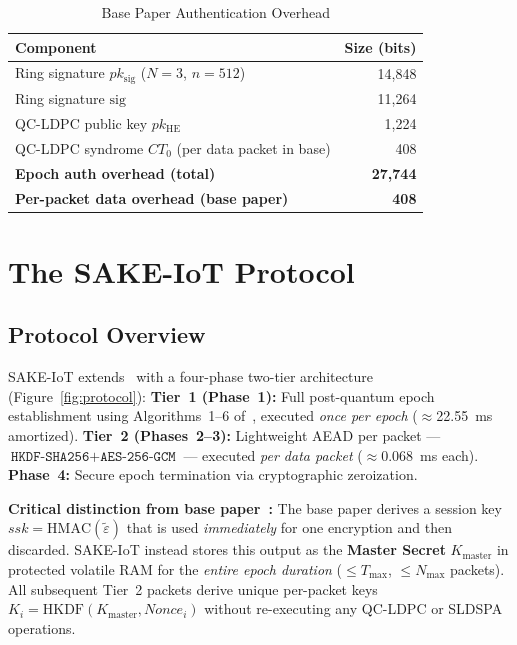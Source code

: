 \documentclass[conference]{IEEEtran}
\newcommand{\GCM}{\texttt{AES-256-GCM}}
\newcommand{\HKDF}{\texttt{HKDF-SHA256}}
\newcommand{\Kmaster}{K_{\mathrm{master}}}
\newcommand{\Nmax}{N_{\max}}
\newcommand{\Tmax}{T_{\max}}
\begin{document}
\begin{table}[!t]
\centering
\caption{Base Paper Authentication Overhead}
\label{tab:baseoverhead}
\begin{tabular}{lr}
\toprule
\textbf{Component} & \textbf{Size (bits)} \\
\midrule
Ring signature $pk_{\mathrm{sig}}$ ($N=3$, $n=512$) & 14,848 \\
Ring signature $\mathrm{sig}$ & 11,264 \\
QC-LDPC public key $pk_{\mathrm{HE}}$ & 1,224 \\
QC-LDPC syndrome $CT_0$ (per data packet in base) & 408 \\
\midrule
\textbf{Epoch auth overhead (total)} & \textbf{27,744} \\
\textbf{Per-packet data overhead (base paper)} & \textbf{408} \\
\bottomrule
\end{tabular}
\end{table}

\section{The SAKE-IoT Protocol}
\label{sec:protocol}

\subsection{Protocol Overview}

SAKE-IoT extends~\cite{kumari2022} with a four-phase two-tier architecture
(Figure~\ref{fig:protocol}):
\textbf{Tier~1 (Phase~1):} Full post-quantum epoch establishment using
Algorithms~1--6 of~\cite{kumari2022}, executed \emph{once per epoch}
($\approx$22.55~ms amortized).
\textbf{Tier~2 (Phases~2--3):} Lightweight AEAD per packet ---
$\HKDF{} + \GCM{}$ --- executed \emph{per data packet}
($\approx$0.068~ms each).
\textbf{Phase~4:} Secure epoch termination via cryptographic zeroization.

\noindent\textbf{Critical distinction from base paper~\cite{kumari2022}:}
The base paper derives a session key $\mathit{ssk} = \mathrm{HMAC}(\tilde{\varepsilon})$
that is used \emph{immediately} for one encryption and then discarded.
SAKE-IoT instead stores this output as the \textbf{Master Secret} $\Kmaster$
in protected volatile RAM for the \emph{entire epoch duration} ($\leq \Tmax$,
$\leq \Nmax$ packets). All subsequent Tier~2 packets derive unique
per-packet keys $K_i = \mathrm{HKDF}(\Kmaster, \mathit{Nonce}_i)$ without
re-executing any QC-LDPC or SLDSPA operations.
\end{document}
